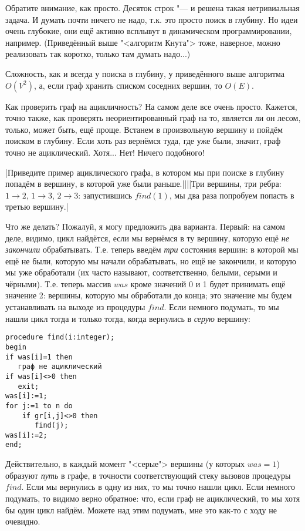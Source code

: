 Обратите внимание, как просто. Десяток строк "--- и решена такая нетривиальная задача. 
И думать почти ничего не надо, т.к. это просто поиск в глубину. Но идеи очень глубокие, они ещё 
активно всплывут в динамическом программировании, например. (Приведённый выше "<алгоритм Кнута">
тоже, наверное, можно реализовать так коротко, только там думать надо...)

Сложность, как и всегда у поиска в глубину, у приведённого выше алгоритма $O(V^2)$, а, если граф 
хранить списком соседних вершин, то $O(E)$.

Как проверить граф на ацикличность? На самом деле все очень просто. Кажется, точно также, как проверять 
неориентированный граф на то, является ли он лесом, только, может быть, ещё проще. Встанем в 
произвольную вершину и пойдём поиском в глубину. Если хоть раз вернёмся туда, где уже были, значит, 
граф точно не ациклический. Хотя... Нет! Ничего подобного!

\task|Приведите пример ациклического графа, в котором мы при поиске в глубину попадём в вершину, в 
которой уже были раньше.||||Три вершины, три ребра: $1\to 2$, $1\to 3$, $2\to 3$: запустившись $find(1)$,
мы два раза попробуем попасть в третью вершину.|\label{acyclicrepeat}

Что же делать? Пожалуй, я могу предложить два варианта. Первый: на самом деле, видимо, цикл 
найдётся, если мы вернёмся в ту вершину, которую ещё \textit{не закончили} обрабатывать. Т.е. теперь введём 
\textit{три} состояния вершин: в которой мы ещё не были, которую мы начали обрабатывать, но ещё не 
закончили, и которую мы уже обработали (их часто называют, соответственно, белыми, серыми и чёрными). 
Т.е. теперь массив $was$ кроме значений 0 и 1 будет принимать ещё значение 2: вершины, которую мы 
обработали до конца; это значение мы будем устанавливать на выходе из процедуры $find$. Если 
немного подумать, то мы нашли цикл тогда и только тогда, когда вернулись в \textit{серую} вершину:
\begin{codesample}\begin{verbatim}
procedure find(i:integer);
begin
if was[i]=1 then
   граф не ациклический
if was[i]<>0 then
   exit;
was[i]:=1;
for j:=1 to n do
    if gr[i,j]<>0 then
       find(j);
was[i]:=2;
end;
\end{verbatim}
\end{codesample}
Действительно, в каждый момент "<серые"> вершины (у которых $was=1$) образуют \textit{путь} в графе, в 
точности соответствующий стеку вызовов процедуры $find$. Если мы вернулись в одну из них, то мы 
точно нашли цикл. Если немного подумать, то видимо верно обратное: что, если граф не ациклический, 
то мы хотя бы один цикл найдём. Можете над этим подумать, мне это как-то с ходу не очевидно.

